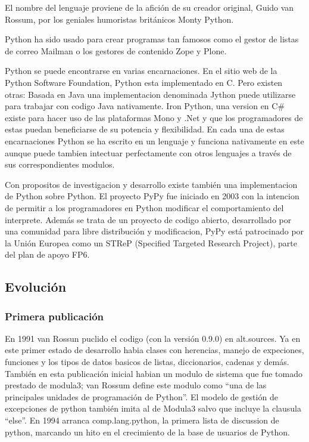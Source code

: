 \documentclass[a4paper,spanish,12pt]{book}
\begin{document}
El nombre del lenguaje proviene de la afición de su creador original, Guido van Rossum, por los geniales humoristas británicos Monty Python.

Python ha sido usado para crear programas tan famosos como el gestor de listas de correo Mailman o los gestores de contenido Zope y Plone.

Python se puede encontrarse en varias encarnaciones. En el sitio web de la Python Software Foundation, Python esta implementado en C. Pero existen otras: Basada en Java una implementacion denominada Jython puede utilizarse para trabajar con codigo Java nativamente. Iron Python, una version en C\# existe para hacer uso de las plataformas Mono y .Net y que los programadores de estas puedan beneficiarse de su potencia y flexibilidad. En cada una de estas encarnaciones Python se ha escrito en un lenguaje y funciona nativamente en este aunque puede tambien intectuar perfectamente con otros lenguajes a trav\'es de sus correspondientes modulos.

Con propositos de investigacion y desarrollo existe tambi\'en una implementacion de Python sobre Python. El proyecto PyPy fue iniciado en 2003 con la intencion de permitir a los programadores en Python modificar el comportamiento del interprete. Además se trata de un proyecto de codigo abierto, desarrollado por una comunidad para libre distribución y modificacion, PyPy está patrocinado por la Unión Europea como un STReP (Specified Targeted Research Project), parte del plan de apoyo FP6.

\subsection{Evolución}

\subsubsection{Primera publicación}

En 1991 van Rossun puclido el codigo (con la versión 0.9.0) en alt.sources. Ya en este primer estado de desarrollo habia clases con herencias, manejo de expeciones, funciones y los tipos de datos basicos de listas, diccionarios, cadenas y demás. Tambi\'en en esta publicación inicial habian un modulo de sistema que fue tomado prestado de modula3; van Rossum define este modulo como ``una de las principales unidades de programación de Python''. El modelo de gestión de excepciones de python tambi\'en imita al de Modula3 salvo que incluye la clausula ``else''. En 1994 arranca comp.lang.python, la primera lista de discussion de python, marcando un hito en el crecimiento de la base de usuarios de Python.
\end{document}
